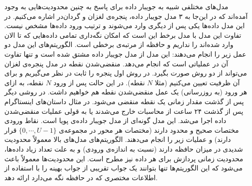 مدل‌های مختلفی شبیه به جویبار داده برای پاسخ به چنین محدودیت‌هایی به وجود آمده‌اند که در این‌جا به ۳ مدل جویبار داده، پنجره‌ی لغزان و گردان‌در اشاره می‌کنیم.
 در این مدل داده‌ها یکی پس از دیگری وارد می‌شوند و ترتیب ورود داده‌ها مشخص نیست. تفاوت این مدل با مدل برخط این است که امکان نگه‌داری تمامی داده‌هایی که تا الان وارد شده‌اند را نداریم و حافظه از مرتبه‌ی برخطی است. الگوریتم‌های این مدل دو عمل زیر را انجام می‌دهند:
 این مدل از مدل جویبار داده مشتق شده است و تنها تفاوت آن در عملیاتی است که انجام می‌دهد.
منقضی‌شدن نقطه در مدل پنجره‌ی لغزان می‌تواند از دو روش صورت بگیرد. در روش اول پنجره را ثابت در نظر می‌گیریم و برای آن ظرفیت تعیین می‌کنیم (مثلا $N$ نقطه). در این حالت پس از ورود $N$ نقطه، به ازای هر ورود (به روزرسانی) یک عمل منقضی‌شدن نقطه هم خواهیم داشت. در روشی دیگر پس از گذشت مقدار زمانی یک نقطه منقضی می‌شود. در مثال  داستان‌های اینستاگرام پس از گذشت ۲۴ ساعت از محاسبات خارج می‌شدند یا به قولی عملیات منقضی‌شدن داده اجرا می‌شد.
 این مدل گونه‌ای از مدل جویبار داده‌ی پویا است. نقاط ورودی مختصات صحیح  و محدود دارند (مختصات هر محور در مجموعه‌ی 
$ \{ 0, \cdots, U-1\}$ 
قرار دارند) و عملیات زیر را انجام می‌دهند.
الگوریتم‌های مدل‌های بالا معمولاً محدودیت شدیدی در میزان حافظه دارند (نسبت به اندازه‌ی ورودی) و به علت تعداد زیاد داده‌ها، محدودیت زمانی پردازش برای هر داده نیز مطرح است. این محدودیت‌ها معمولاً باعث می‌شود که این الگوریتم‌ها تنها بتوانند یک جواب تقریبی از جواب بهینه را با استفاده از اطلاعات مختصری که در حافظه نگه می‌دارد ارائه دهد.

